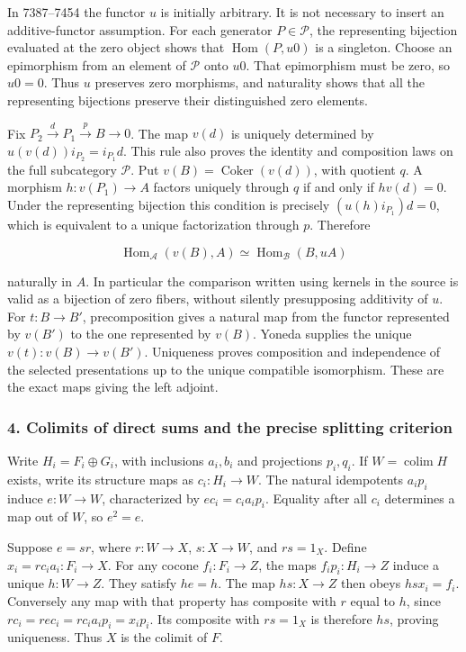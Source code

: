 \documentclass[11pt]{article}
\begin{document}
In 7387--7454 the functor \(u\) is initially arbitrary. It is not necessary to insert an additive-functor assumption. For each generator \(P\in\mathcal P\), the representing bijection evaluated at the zero object shows that \(\operatorname{Hom}(P,u0)\) is a singleton. Choose an epimorphism from an element of \(\mathcal P\) onto \(u0\). That epimorphism must be zero, so \(u0=0\). Thus \(u\) preserves zero morphisms, and naturality shows that all the representing bijections preserve their distinguished zero elements.

Fix \(P_2\xrightarrow d P_1\xrightarrow p B\to0\). The map \(v(d)\) is uniquely determined by \(u(v(d))i_{P_2}=i_{P_1}d\). This rule also proves the identity and composition laws on the full subcategory \(\mathcal P\). Put \(v(B)=\operatorname{Coker}(v(d))\), with quotient \(q\). A morphism \(h:v(P_1)\to A\) factors uniquely through \(q\) if and only if \(h v(d)=0\). Under the representing bijection this condition is precisely \((u(h)i_{P_1})d=0\), which is equivalent to a unique factorization through \(p\). Therefore

\[
\operatorname{Hom}_{\mathcal A}(v(B),A)
\simeq \operatorname{Hom}_{\mathcal B}(B,uA)
\]

naturally in \(A\). In particular the comparison written using kernels in the source is valid as a bijection of zero fibers, without silently presupposing additivity of \(u\). For \(t:B\to B'\), precomposition gives a natural map from the functor represented by \(v(B')\) to the one represented by \(v(B)\). Yoneda supplies the unique \(v(t):v(B)\to v(B')\). Uniqueness proves composition and independence of the selected presentations up to the unique compatible isomorphism. These are the exact maps giving the left adjoint.

\subsubsection{4. Colimits of direct sums and the precise splitting criterion}\label{colimits-of-direct-sums-and-the-precise-splitting-criterion}

Write \(H_i=F_i\oplus G_i\), with inclusions \(a_i,b_i\) and projections \(p_i,q_i\). If \(W=\operatorname{colim}H\) exists, write its structure maps as \(c_i:H_i\to W\). The natural idempotents \(a_i p_i\) induce \(e:W\to W\), characterized by \(e c_i=c_i a_i p_i\). Equality after all \(c_i\) determines a map out of \(W\), so \(e^2=e\).

Suppose \(e=s r\), where \(r:W\to X\), \(s:X\to W\), and \(rs=1_X\). Define \(x_i=r c_i a_i:F_i\to X\). For any cocone \(f_i:F_i\to Z\), the maps \(f_i p_i:H_i\to Z\) induce a unique \(h:W\to Z\). They satisfy \(he=h\). The map \(hs:X\to Z\) then obeys \(hs x_i=f_i\). Conversely any map with that property has composite with \(r\) equal to \(h\), since \(r c_i=r e c_i=r c_i a_i p_i=x_i p_i\). Its composite with \(rs=1_X\) is therefore \(hs\), proving uniqueness. Thus \(X\) is the colimit of \(F\).
\end{document}
